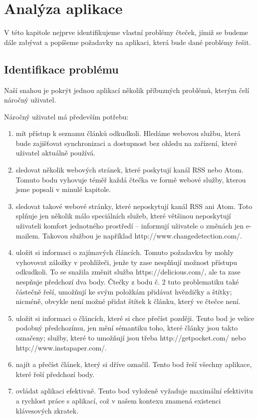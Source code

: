 \chapter{Analýza aplikace}

V této kapitole nejprve identifikujeme vlastní problémy čteček, jímiž se budeme dále zabývat a popíšeme požadavky na aplikaci, která bude dané problémy řešit.

\section{Identifikace problému}

Naší snahou je pokrýt jednou aplikací několik příbuzných problémů, kterým čelí náročný uživatel.


Náročný uživatel má především potřebu:
\begin{enumerate}
    \item mít přístup k seznamu článků odkudkoli.
        Hledáme webovou službu, která bude zajišťovat synchronizaci a dostupnost bez ohledu na zařízení, které uživatel aktuálně používá.
    \item sledovat několik webových stránek, které poskytují kanál RSS nebo Atom.
        Tomuto bodu vyhovuje téměř každá čtečka ve formě webové služby, kterou jsme popsali v minulé kapitole.
    \item sledovat takové webové stránky, které neposkytují kanál RSS ani Atom.
        Toto splňuje jen několik málo speciálních služeb, které většinou neposkytují uživateli komfort jednotného prostředí -- informují uživatele o změnách jen e-mailem.
		Takovou službou je například http://www.changedetection.com/.
    \item uložit si informaci o zajímavých článcích.
        Tomuto požadavku by mohly vyhovovat záložky v prohlížeči, jenže ty zase nesplňují možnost přístupu odkudkoli.
        To se snažila změnit služba https://delicious.com/, ale ta zase nespňuje předchozí dva body.
        Čtečky z bodu č. 2 tuto problematiku také částečně řeší, umožňují ke svým položkám přidávat hvězdičky a štítky; nicméně, obvykle není možné přidat štítek k článku, který ve čtečce není.
    \item uložit si informaci o článcích, které si chce přečíst později.
        Tento bod je velice podobný předchozímu, jen mění sémantiku toho, které články jsou takto označeny; služby, které to umožňují jsou třeba http://getpocket.com/ nebo http://www.instapaper.com/.
    \item najít a přečíst článek, který si dříve označil.
        Tento bod řeší všechny aplikace, které řeší předchozí body.
    \item ovládat aplikaci efektivně.
        Tento bod vyloženě vyžaduje maximální efektivitu a rychlost práce s aplikací, což v našem kontexu znamená existenci klávesových zkratek.
\end{enumerate}

